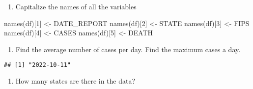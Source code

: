 \documentclass[
]{article}
\newenvironment{Shaded}{\begin{snugshade}}{\end{snugshade}}
\newcommand{\AttributeTok}[1]{\textcolor[rgb]{0.77,0.63,0.00}{#1}}
\newcommand{\DecValTok}[1]{\textcolor[rgb]{0.00,0.00,0.81}{#1}}
\newcommand{\FunctionTok}[1]{\textcolor[rgb]{0.00,0.00,0.00}{#1}}
\newcommand{\NormalTok}[1]{#1}
\newcommand{\OtherTok}[1]{\textcolor[rgb]{0.56,0.35,0.01}{#1}}
\newcommand{\SpecialCharTok}[1]{\textcolor[rgb]{0.00,0.00,0.00}{#1}}
\newcommand{\StringTok}[1]{\textcolor[rgb]{0.31,0.60,0.02}{#1}}
\providecommand{\tightlist}{%
  \setlength{\itemsep}{0pt}\setlength{\parskip}{0pt}}
\begin{document}
\begin{enumerate}
\def\labelenumi{\arabic{enumi}.}
\setcounter{enumi}{5}
\tightlist
\item
  Capitalize the names of all the variables
\end{enumerate}

\begin{Shaded}
\begin{Highlighting}[]
\FunctionTok{names}\NormalTok{(df)[}\DecValTok{1}\NormalTok{] }\OtherTok{\textless{}{-}} \StringTok{\textquotesingle{}DATE\_REPORT\textquotesingle{}}
\FunctionTok{names}\NormalTok{(df)[}\DecValTok{2}\NormalTok{] }\OtherTok{\textless{}{-}} \StringTok{\textquotesingle{}STATE\textquotesingle{}}
\FunctionTok{names}\NormalTok{(df)[}\DecValTok{3}\NormalTok{] }\OtherTok{\textless{}{-}} \StringTok{\textquotesingle{}FIPS\textquotesingle{}}
\FunctionTok{names}\NormalTok{(df)[}\DecValTok{4}\NormalTok{] }\OtherTok{\textless{}{-}} \StringTok{\textquotesingle{}CASES\textquotesingle{}}
\FunctionTok{names}\NormalTok{(df)[}\DecValTok{5}\NormalTok{] }\OtherTok{\textless{}{-}} \StringTok{\textquotesingle{}DEATH\textquotesingle{}}
\end{Highlighting}
\end{Shaded}

\begin{enumerate}
\def\labelenumi{\arabic{enumi}.}
\setcounter{enumi}{6}
\tightlist
\item
  Find the average number of cases per day. Find the maximum cases a
  day.
\end{enumerate}

\begin{Shaded}
\end{Shaded}

\begin{verbatim}
## [1] "2022-10-11"
\end{verbatim}

\begin{enumerate}
\def\labelenumi{\arabic{enumi}.}
\setcounter{enumi}{7}
\tightlist
\item
  How many states are there in the data?
\end{enumerate}
\end{document}
